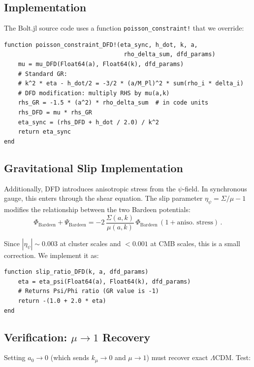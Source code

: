 \documentclass[11pt,a4paper]{article}
\begin{document}
\subsection{Implementation}

The Bolt.jl source code uses a function \texttt{poisson\_constraint!} that we override:

\begin{lstlisting}[caption={Modified Poisson constraint for DFD}]
function poisson_constraint_DFD!(eta_sync, h_dot, k, a,
                                  rho_delta_sum, dfd_params)
    mu = mu_DFD(Float64(a), Float64(k), dfd_params)
    # Standard GR:
    # k^2 * eta - h_dot/2 = -3/2 * (a/M_Pl)^2 * sum(rho_i * delta_i)
    # DFD modification: multiply RHS by mu(a,k)
    rhs_GR = -1.5 * (a^2) * rho_delta_sum  # in code units
    rhs_DFD = mu * rhs_GR
    eta_sync = (rhs_DFD + h_dot / 2.0) / k^2
    return eta_sync
end
\end{lstlisting}

\subsection{Gravitational Slip Implementation}

Additionally, DFD introduces anisotropic stress from the $\psi$-field. In synchronous gauge, this enters through the shear equation. The slip parameter $\eta_\psi = \Sigma/\mu - 1$ modifies the relationship between the two Bardeen potentials:
\begin{equation}
\Phi_{\mathrm{Bardeen}} + \Psi_{\mathrm{Bardeen}} = -2\,\frac{\Sigma(a,k)}{\mu(a,k)}\,\Phi_{\mathrm{Bardeen}}\,(1 + \text{aniso.\ stress})\,.
\end{equation}

Since $|\eta_\psi| \sim 0.003$ at cluster scales and $< 0.001$ at CMB scales, this is a small correction. We implement it as:

\begin{lstlisting}[caption={Gravitational slip for DFD}]
function slip_ratio_DFD(k, a, dfd_params)
    eta = eta_psi(Float64(a), Float64(k), dfd_params)
    # Returns Psi/Phi ratio (GR value is -1)
    return -(1.0 + 2.0 * eta)
end
\end{lstlisting}

\subsection{Verification: $\mu \to 1$ Recovery}

Setting $a_0 \to 0$ (which sends $k_\mu \to 0$ and $\mu \to 1$) must recover exact $\Lambda$CDM. Test:
\end{document}
